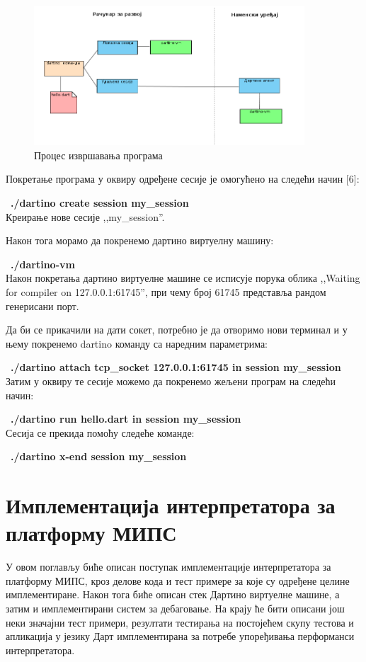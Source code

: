 \documentclass[12pt,oneside]{memoir}
\begin{document}
\begin{figure}[!ht]
  \centering
  \includegraphics[width=0.9\textwidth]{sesije.png}
  \caption{Процес извршавања програма}
  \label{fig:izvrsavanje}
\end{figure}

Покретање програма у оквиру одређене сесије је омогућено на следећи начин [6]:

~\textbf{./dartino create session my\_session}\\
Креирање нове сесије ,,my\_session''.

Након тога морамо да покренемо дартино виртуелну машину:

~\textbf{./dartino-vm}\\
Након покретања дартино виртуелне машине се исписује порука облика ,,Waiting for compiler on 127.0.0.1:61745'', при чему број 61745 представља рандом генерисани порт.

Да би се прикачили на дати сокет, потребно је да отворимо нови терминал и у њему покренемо dartino команду са наредним параметрима:

~\textbf{./dartino attach tcp\_socket 127.0.0.1:61745 in session my\_session}\\

Затим у оквиру те сесије можемо да покренемо жељени програм на следећи начин:

~\textbf{./dartino run hello.dart in session my\_session}\\

Сесија се прекида помоћу следеће команде:

~\textbf{./dartino x-end session my\_session}\\


\chapter{Имплементација интерпретатора за платформу МИПС}
\label{chp:implementacija}
У овом поглављу биће описан поступак имплементације интерпретатора за платформу МИПС, кроз делове кода и тест примере за које су одређене целине имплементиране. Након тога биће описан стек Дартино виртуелне машине, а затим и имплементирани систем за дебаговање. На крају ће бити описани још неки значајни тест примери, резултати тестирања на постојећем скупу тестова и апликација у језику Дарт имплементирана за потребе упоређивања перформанси интерпретатора.
\end{document}
